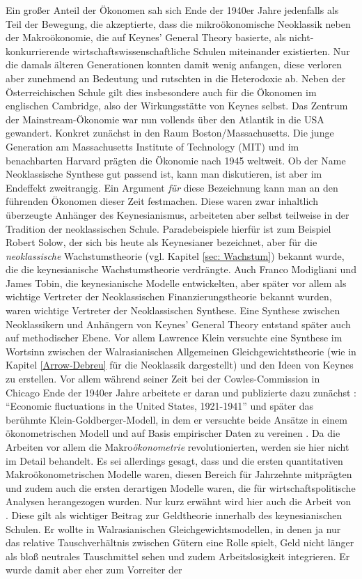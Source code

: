 Ein großer Anteil der Ökonomen sah sich Ende der 1940er Jahre jedenfalls als Teil der Bewegung, die akzeptierte, dass die mikroökonomische Neoklassik neben der Makroökonomie, die auf Keynes' General Theory basierte, als nicht-konkurrierende wirtschaftswissenschaftliche Schulen miteinander existierten. Nur die damals älteren Generationen konnten damit wenig anfangen, diese verloren aber zunehmend an Bedeutung und rutschten in die Heterodoxie ab. Neben der Österreichischen Schule gilt dies insbesondere auch für die Ökonomen im englischen Cambridge, also der Wirkungsstätte von Keynes selbst. Das Zentrum der Mainstream-Ökonomie war nun vollends über den Atlantik in die USA gewandert. Konkret zunächst in den Raum Boston/Massachusetts. Die junge Generation am Massachusetts Institute of Technology (MIT) und im benachbarten Harvard prägten die Ökonomie nach 1945 weltweit. Ob der Name Neoklassische Synthese gut passend ist, kann man diskutieren, ist aber im Endeffekt zweitrangig. Ein Argument \textit{für} diese Bezeichnung kann man an den führenden Ökonomen dieser Zeit festmachen. Diese waren zwar inhaltlich überzeugte Anhänger des Keynesianismus, arbeiteten aber selbst teilweise in der Tradition der neoklassischen Schule. Paradebeispiele hierfür ist zum Beispiel Robert Solow, der sich bis heute als Keynesianer bezeichnet, aber für die \textit{neoklassische} Wachstumstheorie (vgl. Kapitel \ref{sec: Wachstum}) bekannt wurde, die die keynesianische Wachstumstheorie verdrängte. Auch Franco Modigliani und James Tobin, die keynesianische Modelle entwickelten, aber später vor allem als wichtige Vertreter der Neoklassischen Finanzierungstheorie bekannt wurden, waren wichtige Vertreter der Neoklassischen Synthese. Eine Synthese zwischen Neoklassikern und Anhängern von Keynes' General Theory entstand später auch auf methodischer Ebene. Vor allem Lawrence Klein versuchte eine Synthese im Wortsinn zwischen der Walrasianischen Allgemeinen Gleichgewichtstheorie (wie in Kapitel \ref{Arrow-Debreu} für die Neoklassik dargestellt) und den Ideen von Keynes zu erstellen. Vor allem während seiner Zeit bei der Cowles-Commission in Chicago Ende der 1940er Jahre arbeitete er daran und publizierte dazu zunächst \textcite{Klein1950}: "`Economic fluctuations in the United States, 1921-1941"' und später das berühmte Klein-Goldberger-Modell, in dem er versuchte beide Ansätze in einem ökonometrischen Modell und auf Basis empirischer Daten zu vereinen \parencite{Klein1955}. Da die Arbeiten vor allem die Makro\textit{ökonometrie} revolutionierten, werden sie hier nicht im Detail behandelt. Es sei allerdings gesagt, dass \textcite{Klein1950} und \textcite{Klein1955} die ersten quantitativen Makroökonometrischen Modelle waren, diesen Bereich für Jahrzehnte mitprägten und zudem auch die ersten derartigen Modelle waren, die für wirtschaftspolitische Analysen herangezogen wurden. Nur kurz erwähnt wird hier auch die Arbeit von \textcite{Patinkin1956}. Diese gilt als wichtiger Beitrag zur Geldtheorie innerhalb des keynesianischen Schulen. Er wollte in Walrasianischen Gleichgewichtsmodellen, in denen ja nur das relative Tauschverhältnis zwischen Gütern eine Rolle spielt, Geld nicht länger als bloß neutrales Tauschmittel sehen und zudem Arbeitslosigkeit integrieren. Er wurde damit aber eher zum Vorreiter der 